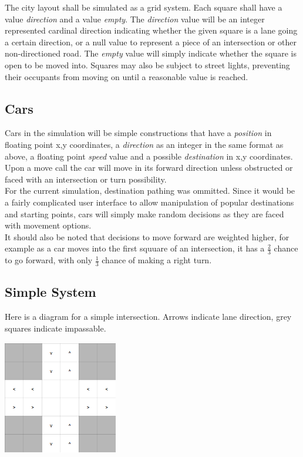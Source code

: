 \documentclass{article}
\begin{document}
The city layout shall be simulated as a grid system.  Each square shall have a value \emph{direction} and a value \emph{empty}.  The \emph{direction} value will be an integer represented cardinal direction indicating whether the given square is a lane going a certain direction, or a null value to represent a piece of an intersection or other non-directioned road.  The \emph{empty} value will simply indicate whether the square is open to be moved into.  Squares may also be subject to street lights, preventing their occupants from moving on until a reasonable value is reached.

\subsection{Cars}

Cars in the simulation will be simple constructions that have a \emph{position} in floating point x,y coordinates, a \emph{direction} as an integer in the same format as above, a floating point \emph{speed} value and a possible \emph{destination} in x,y coordinates.  Upon a move call the car will move in its forward direction unless obstructed or faced with an intersection or turn possibility.\\
For the current simulation, destination pathing was ommitted.  Since it would be a fairly complicated user interface to allow manipulation of popular destinations and  starting points, cars will simply make random decisions as they are faced with movement options.\\
It should also be noted that decisions to move forward are weighted higher, for example as a car moves into the first squuare of an intersection, it has a $\frac{2}{3}$ chance to go forward, with only $\frac{1}{3}$ chance of making a right turn.

\subsection{Simple System}

Here is a diagram for a simple intersection.  Arrows indicate lane direction, grey squares indicate impassable.

\centerline{\includegraphics[width=5cm, height=5cm]{city_grid}}
\end{document}
